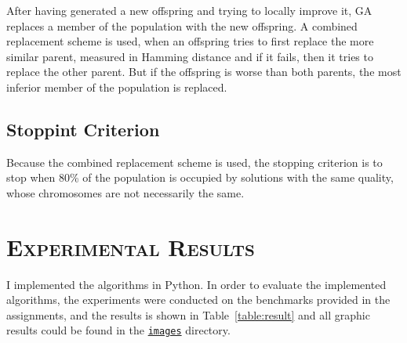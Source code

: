 \documentclass[11pt]{article}
\begin{document}
After having generated a new offspring and trying to locally improve it, GA replaces a member of 
the population with the new offspring. A combined replacement scheme is used, when an offspring 
tries to first replace the more similar parent, measured in Hamming distance and if it fails, then 
it tries to replace the other parent. But if the offspring is worse than both parents, the most 
inferior member of the population is replaced.

\subsection{Stoppint Criterion}

Because the combined replacement scheme is used, the stopping criterion is to stop when 80\% of 
the population is occupied by solutions with the same quality, whose chromosomes are not necessarily 
the same.


\section{\textsc{Experimental Results}}

I implemented the algorithms in Python. In order to evaluate the implemented algorithms, the 
experiments were conducted on the benchmarks provided in the assignments, and the results is shown 
in Table~\ref{table:result} and all graphic results could be found in the \href{https://github.com/ZhenpengWu/Genetic-Partitioning/tree/master/docs/images}{\texttt{images}} directory.
\end{document}
